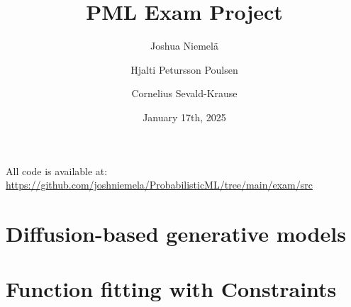 \documentclass{article}
\begin{document}
\title{PML Exam Project}
\author{
  Joshua Niemelä
  \and
  Hjalti Petursson Poulsen
  \and
  Cornelius Sevald-Krause
}
\date{January 17th, 2025}
\maketitle

All code is available at: \url{https://github.com/joshniemela/ProbabilisticML/tree/main/exam/src}

\section{Diffusion-based generative models}


\section{Function fitting with Constraints}


\printbibliography

\appendix

\end{document}
